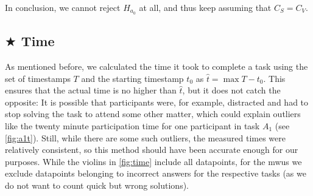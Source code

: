 \documentclass[../thesis]{subfiles}
\begin{document}
In conclusion, we cannot reject $H_{a_0}$ at all, and thus keep assuming that $C_S = C_V$.

\subsection{$\bigstar$ Time}\label{subsec:time}
As mentioned before, we calculated the time it took to complete a task using the set of timestamps $T$ and the starting timestamp $t_0$ as $\hat{t} = \max T - t_0$.
This ensures that the actual time is no higher than $\hat{t}$, but it does not catch the opposite:
It is possible that participants were, for example, distracted and had to stop solving the task to attend some other matter, which could explain outliers like the twenty minute participation time for one participant in task $A_1$ (see \cref{fig:a1t}).
Still, while there are some such outliers, the measured times were relatively consistent, so this method should have been accurate enough for our purposes.
While the \glspl{violin} in \cref{fig:time} include all datapoints, for the \glspl{mwu} we exclude datapoints belonging to incorrect answers for the respective tasks (as we do not want to count quick but wrong solutions).
\end{document}
